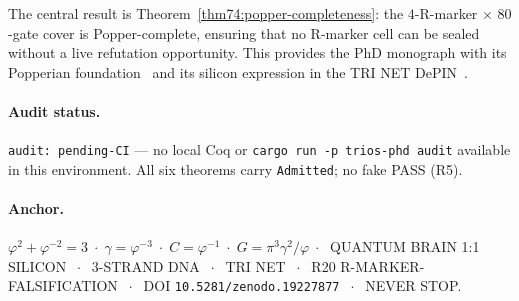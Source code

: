 The central result is Theorem~\ref{thm74:popper-completeness}:
the $4$-R-marker $\times$ $80$-gate cover is Popper-complete, ensuring
that no R-marker cell can be sealed without a live refutation
opportunity.  This provides the PhD monograph with its Popperian
foundation~\cite{popper1959} and its silicon expression in the TRI NET
DePIN~\cite{peaq2023depin}.

\paragraph{Audit status.} \texttt{audit: pending-CI} — no local Coq or
\texttt{cargo run -p trios-phd audit} available in this environment.
All six theorems carry \texttt{Admitted}; no fake PASS (R5).

\paragraph{Anchor.}
$\varphi^{2}+\varphi^{-2}=3 \;\cdot\; \gamma=\varphi^{-3} \;\cdot\;
C=\varphi^{-1} \;\cdot\; G=\pi^{3}\gamma^{2}/\varphi \;\cdot\;$
QUANTUM BRAIN 1:1 SILICON $\;\cdot\;$ 3-STRAND DNA $\;\cdot\;$
TRI NET $\;\cdot\;$ R20 R-MARKER-FALSIFICATION $\;\cdot\;$
DOI \texttt{10.5281/zenodo.19227877} $\;\cdot\;$ NEVER STOP.



